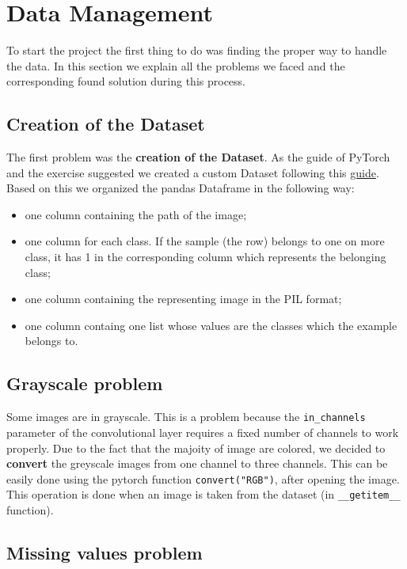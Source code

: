 \section{Data Management}
To start the project the first thing to do was finding the proper way to handle the data. In this section we explain all the problems we faced and the corresponding found solution during this process.

\subsection{Creation of the Dataset}
The first problem was the \textbf{creation of the Dataset}. As the guide of PyTorch and the exercise suggested we created a custom Dataset following this \href{https://github.com/utkuozbulak/pytorch-custom-dataset-examples}{guide}. Based on this we organized the pandas Dataframe in the following way:
\begin{itemize}
	\item one column containing the path of the image;
	\item one column for each class. If the sample (the row) belongs to one on more class, it has 1 in the corresponding column which represents the belonging class;
	\item one column containing the representing image in the PIL format;
	\item one column containg one list whose values are the classes which the example belongs to.
\end{itemize}

\subsection{Grayscale problem}

Some images are in grayscale. This is a problem because the \texttt{in\_channels} parameter of the convolutional layer requires a fixed number of channels to work properly. Due to the fact that the majoity of image are colored, we decided to \textbf{convert} the greyscale images from one channel to three channels. This can be easily done using the pytorch function \texttt{convert("RGB")}, after opening the image.
This operation is done when an image is taken from the dataset (in \texttt{\_\_getitem\_\_} function).

\subsection{Missing values problem}

